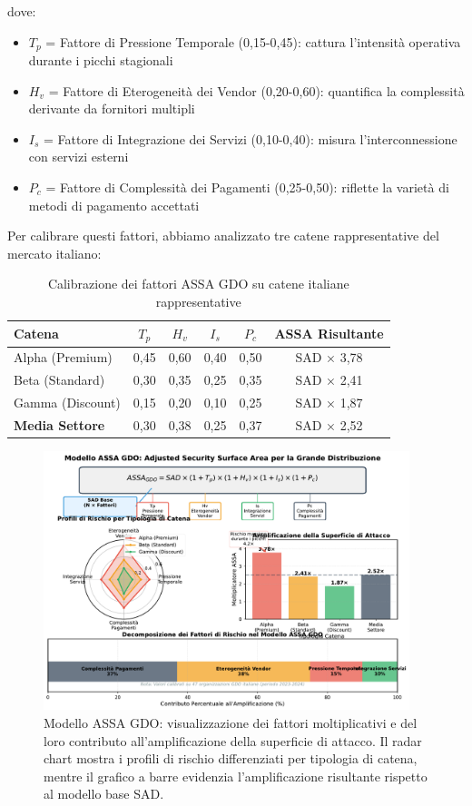 dove:
\begin{itemize}
    \item $T_p$ = Fattore di Pressione Temporale (0,15-0,45): cattura l'intensità operativa durante i picchi stagionali
    \item $H_v$ = Fattore di Eterogeneità dei Vendor (0,20-0,60): quantifica la complessità derivante da fornitori multipli
    \item $I_s$ = Fattore di Integrazione dei Servizi (0,10-0,40): misura l'interconnessione con servizi esterni
    \item $P_c$ = Fattore di Complessità dei Pagamenti (0,25-0,50): riflette la varietà di metodi di pagamento accettati
\end{itemize}

Per calibrare questi fattori, abbiamo analizzato tre catene rappresentative del mercato italiano:

\begin{table}[htbp]
\centering
\caption{Calibrazione dei fattori ASSA GDO su catene italiane rappresentative}
\label{tab:assa_calibration}
\begin{tabular}{lccccc}
\toprule
\textbf{Catena} & \textbf{$T_p$} & \textbf{$H_v$} & \textbf{$I_s$} & \textbf{$P_c$} & \textbf{ASSA Risultante} \\
\midrule
Alpha (Premium) & 0,45 & 0,60 & 0,40 & 0,50 & SAD × 3,78 \\
Beta (Standard) & 0,30 & 0,35 & 0,25 & 0,35 & SAD × 2,41 \\
Gamma (Discount) & 0,15 & 0,20 & 0,10 & 0,25 & SAD × 1,87 \\
\midrule
\textbf{Media Settore} & 0,30 & 0,38 & 0,25 & 0,37 & SAD × 2,52 \\
\bottomrule
\end{tabular}
\end{table}

\begin{figure}[htbp]
\centering
\includegraphics[width=0.95\textwidth]{thesis_figures/cap2/fig_2_6_assa_gdo_model.pdf}
\caption{Modello ASSA GDO: visualizzazione dei fattori moltiplicativi e del loro contributo all'amplificazione della superficie di attacco. Il radar chart mostra i profili di rischio differenziati per tipologia di catena, mentre il grafico a barre evidenzia l'amplificazione risultante rispetto al modello base SAD.}
\label{fig:assa_gdo_model}
\end{figure}

